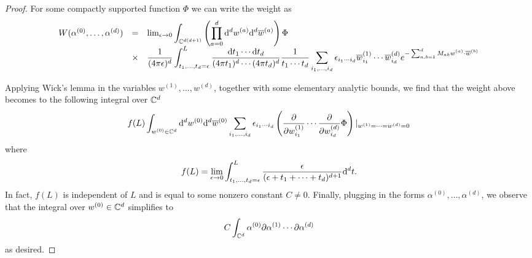 \begin{proof}
For some compactly supported function $\Phi$ we can write the weight as
\[
\begin{array}{ccl}
W (\alpha^{(0)}, \ldots, \alpha^{(d)}) & = & \lim_{\epsilon \to 0} \displaystyle \int_{\mathbb C^{d(d+1)}} \left(\prod_{a = 0}^{d} {\rm d}^d w^{(a)} {\rm d}^d \overline{w}^{(a)}\right) \Phi \\ & \times & \displaystyle \frac{1}{(4 \pi \epsilon)^d} \int_{t_1,\ldots,t_d = \epsilon}^L \frac{{\rm d} t_1 \cdots {\rm d} t_d}{(4 \pi t_1)^d \cdots (4 \pi t_d)^d} \frac{1}{t_1\cdots t_d} \sum_{i_1,\ldots, i_d} \epsilon_{i_1\cdots i_d} \overline{w}_{i_1}^{(1)} \cdots \overline{w}_{i_d}^{(d)} e^{-\sum_{a,b = 1}^d M_{a b} w^{(a)} \cdot \overline{w}^{(b)}} 
\end{array}
\]

Applying Wick's lemma in the variables $w^{(1)}, \ldots, w^{(d)}$, together with some elementary analytic bounds, we find that the weight above becomes to the following integral over $\mathbb C^d$
\[
f(L) \int_{w^{(0)} \in \mathbb C^d}  {\rm d}^d w^{(0)} {\rm d}^d \overline{w}^{(0)} \sum_{i_1,\ldots, i_d} \epsilon_{i_1\cdots i_d}  
\left(\frac{\partial}{\partial w_{i_1}^{(1)}} \cdots \frac{\partial}{\partial w_{i_d}^{(d)}} \Phi\right)|_{w^{(1)}=\cdots=w^{(d)} = 0} 
\]
where
\[
f(L) = \lim_{\epsilon \to 0} \int_{t_1,\ldots,t_d = \epsilon}^L \frac{\epsilon}{(\epsilon + t_1 + \cdots + t_d)^{d+1}} {\rm d}^d t .
\]
In fact, $f(L)$ is independent of $L$ and is equal to some nonzero constant $C \ne 0$.
Finally, plugging in the forms $\alpha^{(0)}, \ldots, \alpha^{(d)}$, we observe that the integral over $w^{(0)} \in \mathbb C^d$ simplifies to
\[
C \int_{\mathbb C^d} \alpha^{(0)} \partial \alpha^{(1)} \cdots\partial \alpha^{(d)}
\]
as desired.

\end{proof}

